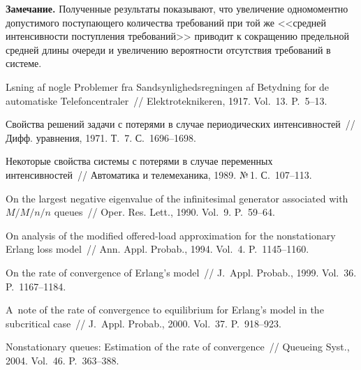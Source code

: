 {\begin{multicols}{2}
\medskip

\noindent
\textbf{Замечание.} Полученные результаты показывают, что
увеличение одномоментно допустимого поступающего количества
требований при той же <<средней интенсивности поступления
требований>> приводит к сокращению предельной средней длины очереди
и увеличению вероятности отсутствия требований в системе.


{\small\frenchspacing
 {%

 \begin{thebibliography}{99}
 L{\hspace*{-1mm}\ptb{\o}}\hspace*{1pt}sning af nogle Problemer fra Sandsynlighedsregningen af Betydning for de automatiske
Telefoncentraler~// Elektroteknikeren, 1917. Vol.~13. P.~5--13.

Свойства решений задачи с потерями в случае периодических интенсивностей~//
Дифф. уравнения, 1971.  Т.~7. С.~1696--1698.

Некоторые свойства системы с потерями в случае переменных интенсивностей~//
Автоматика и телемеханика, 1989. №\,1. С.~107--113.

On the largest negative eigenvalue of the infinitesimal generator associated with $M/M/n/n$
queues~// Oper. Res. Lett., 1990. Vol.~9. P.~59--64.

On analysis of the modified offered-load approximation for the nonstationary Erlang
loss model~// Ann. Appl. Probab., 1994. Vol.~4. P.~1145--1160.

On the rate of convergence of Erlang's model~//
J.~Appl. Probab., 1999. Vol.~36. P.~1167--1184.


  A~note of the rate of convergence to equilibrium
 for Erlang's model in the subcritical case~//
 J.~Appl. Probab., 2000. Vol.~37. P.~918--923.

 Nonstationary queues:
Estimation of the rate of convergence~// Queueing Syst., 2004.
Vol.~46. P.~363--388.


\end{thebibliography}}}
\end{multicols}}
